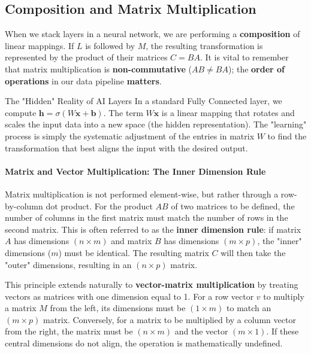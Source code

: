 \subsection{Composition and Matrix Multiplication}
When we stack layers in a neural network, we are performing a \textbf{composition} of linear mappings. If $L$ is followed by $M$, the resulting transformation is represented by the product of their matrices $C = BA$. It is vital to remember that matrix multiplication is \textbf{non-commutative} ($AB \neq BA$); the \textbf{order of operations} in our data pipeline \textbf{matters}.

\begin{unibobox}{The "Hidden" Reality of AI Layers}
    In a standard Fully Connected layer, we compute $\mathbf{h} = \sigma(W\mathbf{x} + \mathbf{b})$. The term $W\mathbf{x}$ is a linear mapping that rotates and scales the input data into a new space (the hidden representation). The "learning" process is simply the systematic adjustment of the entries in matrix $W$ to find the transformation that best aligns the input with the desired output.
\end{unibobox}

\paragraph{Matrix and Vector Multiplication: The Inner Dimension Rule}

Matrix multiplication is not performed element-wise, but rather through a row-by-column dot product. For the product $AB$ of two matrices to be defined, the number of columns in the first matrix must match the number of rows in the second matrix. This is often referred to as the \textbf{inner dimension rule}: if matrix $A$ has dimensions $(n \times m)$ and matrix $B$ has dimensions $(m \times p)$, the "inner" dimensions ($m$) must be identical. The resulting matrix $C$ will then take the "outer" dimensions, resulting in an $(n \times p)$ matrix.



This principle extends naturally to \textbf{vector-matrix multiplication} by treating vectors as matrices with one dimension equal to 1. For a row vector $v$ to multiply a matrix $M$ from the left, its dimensions must be $(1 \times m)$ to match an $(m \times p)$ matrix. Conversely, for a matrix to be multiplied by a column vector from the right, the matrix must be $(n \times m)$ and the vector $(m \times 1)$. If these central dimensions do not align, the operation is mathematically undefined.



